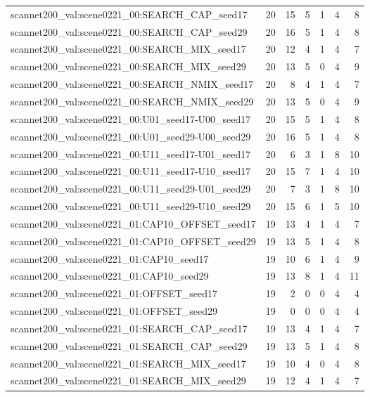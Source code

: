 \begin{table}[t]
\begin{tabular}{lrrrrrr}
scannet200\_val:scene0221\_00:SEARCH\_CAP\_seed17 & 20 & 15 & 5 & 1 & 4 & 8 \\
scannet200\_val:scene0221\_00:SEARCH\_CAP\_seed29 & 20 & 16 & 5 & 1 & 4 & 8 \\
scannet200\_val:scene0221\_00:SEARCH\_MIX\_seed17 & 20 & 12 & 4 & 1 & 4 & 7 \\
scannet200\_val:scene0221\_00:SEARCH\_MIX\_seed29 & 20 & 13 & 5 & 0 & 4 & 9 \\
scannet200\_val:scene0221\_00:SEARCH\_NMIX\_seed17 & 20 & 8 & 4 & 1 & 4 & 7 \\
scannet200\_val:scene0221\_00:SEARCH\_NMIX\_seed29 & 20 & 13 & 5 & 0 & 4 & 9 \\
scannet200\_val:scene0221\_00:U01\_seed17-U00\_seed17 & 20 & 15 & 5 & 1 & 4 & 8 \\
scannet200\_val:scene0221\_00:U01\_seed29-U00\_seed29 & 20 & 16 & 5 & 1 & 4 & 8 \\
scannet200\_val:scene0221\_00:U11\_seed17-U01\_seed17 & 20 & 6 & 3 & 1 & 8 & 10 \\
scannet200\_val:scene0221\_00:U11\_seed17-U10\_seed17 & 20 & 15 & 7 & 1 & 4 & 10 \\
scannet200\_val:scene0221\_00:U11\_seed29-U01\_seed29 & 20 & 7 & 3 & 1 & 8 & 10 \\
scannet200\_val:scene0221\_00:U11\_seed29-U10\_seed29 & 20 & 15 & 6 & 1 & 5 & 10 \\
scannet200\_val:scene0221\_01:CAP10\_OFFSET\_seed17 & 19 & 13 & 4 & 1 & 4 & 7 \\
scannet200\_val:scene0221\_01:CAP10\_OFFSET\_seed29 & 19 & 13 & 5 & 1 & 4 & 8 \\
scannet200\_val:scene0221\_01:CAP10\_seed17 & 19 & 10 & 6 & 1 & 4 & 9 \\
scannet200\_val:scene0221\_01:CAP10\_seed29 & 19 & 13 & 8 & 1 & 4 & 11 \\
scannet200\_val:scene0221\_01:OFFSET\_seed17 & 19 & 2 & 0 & 0 & 4 & 4 \\
scannet200\_val:scene0221\_01:OFFSET\_seed29 & 19 & 0 & 0 & 0 & 4 & 4 \\
scannet200\_val:scene0221\_01:SEARCH\_CAP\_seed17 & 19 & 13 & 4 & 1 & 4 & 7 \\
scannet200\_val:scene0221\_01:SEARCH\_CAP\_seed29 & 19 & 13 & 5 & 1 & 4 & 8 \\
scannet200\_val:scene0221\_01:SEARCH\_MIX\_seed17 & 19 & 10 & 4 & 0 & 4 & 8 \\
scannet200\_val:scene0221\_01:SEARCH\_MIX\_seed29 & 19 & 12 & 4 & 1 & 4 & 7 \\

\end{tabular}
\end{table}
